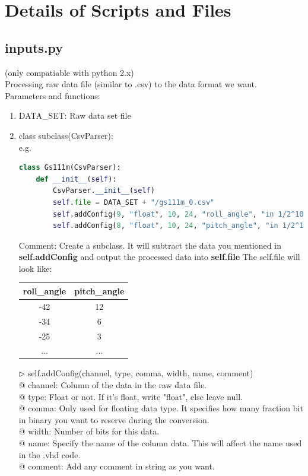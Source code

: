 \documentclass{article}
\theoremstyle{definition}
\begin{document}
\section{Details of Scripts and Files}
\subsection{inputs.py}\label{inputs.py}
(only compatiable with python 2.x)\\
Processing raw data file (similar to .csv) to the data format we want.\\
Parameters and functions:
\begin{enumerate}
	\item DATA\_SET: Raw data set file
	\item class subclass(CsvParser): \\
e.g.
\begin{lstlisting}[language=Python]
class Gs111m(CsvParser):
	def __init__(self):
		CsvParser.__init__(self)
		self.file = DATA_SET + "/gs111m_0.csv"
		self.addConfig(9, "float", 10, 24, "roll_angle", "in 1/2^10 rad")
		self.addConfig(8, "float", 10, 24, "pitch_angle", "in 1/2^10 rad")
\end{lstlisting}
Comment: Create a subclass. It will subtract the data you mentioned in \textbf{self.addConfig} and output the processed data into \textbf{self.file}
The self.file will look like:
\begin{center}
\begin{tabular}{ c|c}
 \hline
 roll\_angle & pitch\_angle \\
 \hline
 -42 & 12 \\
 \hline
 -34 & 6\\
 \hline
 -25 & 3\\
 ...&...
\end{tabular}
\end{center}
$\triangleright$ self.addConfig(channel, type, comma, width, name, comment)\\
@ channel: Column of the data in the raw data file.\\
@ type: Float or not. If it's float, write "float", else leave null.\\
@ comma: Only used for floating data type. It specifies how many fraction bit in binary you want to reserve during the conversion.\\
@ width: Number of bits for this data.\\
@ name: Specify the name of the column data. This will affect the name used in the .vhd code.\\
@ comment: Add any comment in string as you want.


\end{enumerate}
\end{document}
